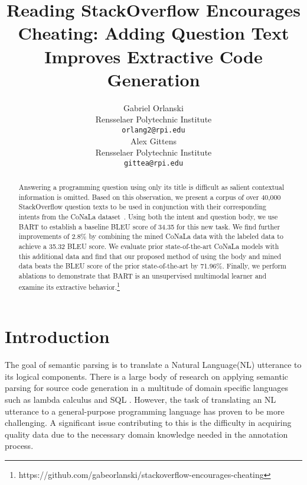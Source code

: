 \documentclass[11pt]{article}
\title{Reading StackOverflow Encourages Cheating: Adding Question Text Improves Extractive Code Generation}
\author{Gabriel Orlanski \\
  Rensselaer Polytechnic Institute \\
  \texttt{orlang2@rpi.edu} \\\And
  Alex Gittens \\
  Rensselaer Polytechnic Institute\\
  \texttt{gittea@rpi.edu} \\}
\begin{document}
\maketitle
\begin{abstract}
Answering a programming question using only its title is difficult as salient contextual information is omitted. Based on this observation, we present a corpus of over 40,000 StackOverflow question texts to be used in conjunction with their corresponding intents from the CoNaLa dataset~\citep{yin2018learning}. Using both the intent and question body, we use BART to establish a baseline BLEU score of 34.35 for this new task. We find further improvements of 2.8\% by combining the mined CoNaLa data with the labeled data to achieve a 35.32 BLEU score. We evaluate prior state-of-the-art CoNaLa models with this additional data and find that our proposed method of using the body and mined data beats the BLEU score of the prior state-of-the-art by 71.96\%. Finally, we perform ablations to demonstrate that BART is an unsupervised multimodal learner and examine its extractive behavior.\footnote{https://github.com/gabeorlanski/stackoverflow-encourages-cheating}
\end{abstract}

\section{Introduction}
\indent The goal of semantic parsing is to translate a Natural Language(NL) utterance to its logical components. There is a large body of research on applying semantic parsing for source code generation in a multitude of domain specific languages such as lambda calculus and SQL \citep{dahl-etal-1994-expanding,zelleMooneyParseDB,zettlemeyorLearningtoMap,ling-etal-2016-latent,xiao-etal-2016-sequence,rabinovich-etal-2017-abstract,dong-lapata-2018-coarse,guo-etal-2019-towards,hwang2019comprehensive,tabassum-etal-2020-code}. However, the task of translating an NL utterance to a general-purpose programming language has proven to be more challenging. A significant issue contributing to this is the difficulty in acquiring quality data due to the necessary domain knowledge needed in the annotation process. 
\end{document}
